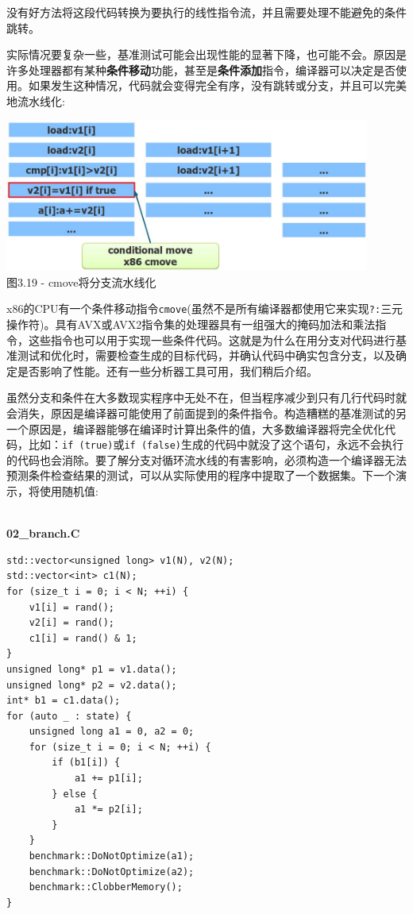 没有好方法将这段代码转换为要执行的线性指令流，并且需要处理不能避免的条件跳转。

实际情况要复杂一些，基准测试可能会出现性能的显著下降，也可能不会。原因是许多处理器都有某种\textbf{条件移动}功能，甚至是\textbf{条件添加}指令，编译器可以决定是否使用。如果发生这种情况，代码就会变得完全有序，没有跳转或分支，并且可以完美地流水线化:

\begin{center}
\includegraphics[width=0.9\textwidth]{content/1/chapter3/images/19.jpg}\\
图3.19 - cmove将分支流水线化
\end{center}

x86的CPU有一个条件移动指令\texttt{cmove}(虽然不是所有编译器都使用它来实现\texttt{?:}三元操作符)。具有AVX或AVX2指令集的处理器具有一组强大的掩码加法和乘法指令，这些指令也可以用于实现一些条件代码。这就是为什么在用分支对代码进行基准测试和优化时，需要检查生成的目标代码，并确认代码中确实包含分支，以及确定是否影响了性能。还有一些分析器工具可用，我们稍后介绍。

虽然分支和条件在大多数现实程序中无处不在，但当程序减少到只有几行代码时就会消失，原因是编译器可能使用了前面提到的条件指令。构造糟糕的基准测试的另一个原因是，编译器能够在编译时计算出条件的值，大多数编译器将完全优化代码，比如：\texttt{if (true)}或\texttt{if (false)}生成的代码中就没了这个语句，永远不会执行的代码也会消除。要了解分支对循环流水线的有害影响，必须构造一个编译器无法预测条件检查结果的测试，可以从实际使用的程序中提取了一个数据集。下一个演示，将使用随机值:

\hspace*{\fill} \\ %
\noindent
\textbf{02\_branch.C}
\begin{lstlisting}[style=styleCXX]
std::vector<unsigned long> v1(N), v2(N);
std::vector<int> c1(N);
for (size_t i = 0; i < N; ++i) {
	v1[i] = rand();
	v2[i] = rand();
	c1[i] = rand() & 1;
}
unsigned long* p1 = v1.data();
unsigned long* p2 = v2.data();
int* b1 = c1.data();
for (auto _ : state) {
	unsigned long a1 = 0, a2 = 0;
	for (size_t i = 0; i < N; ++i) {
		if (b1[i]) {
			a1 += p1[i];
		} else {
			a1 *= p2[i];
		}
	}
	benchmark::DoNotOptimize(a1);
	benchmark::DoNotOptimize(a2);
	benchmark::ClobberMemory();
}
\end{lstlisting}

